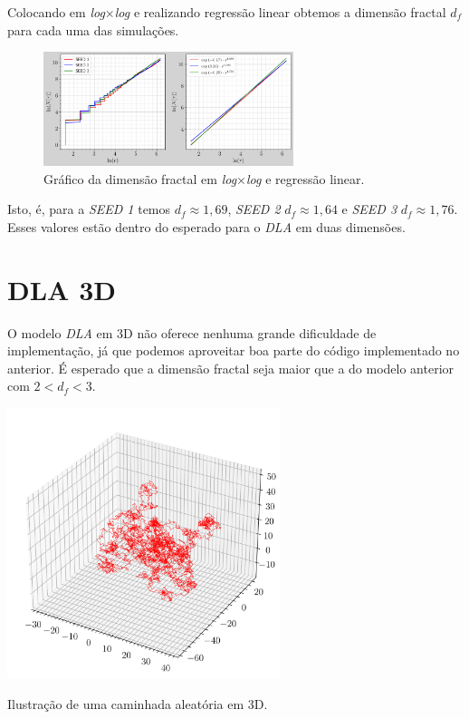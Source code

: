 \documentclass[a4paper, 11pt]{tufte-handout}
\begin{document}
Colocando em \emph{log}$\times$\emph{log} e realizando regressão linear obtemos a dimensão fractal
\( d_f \) para cada uma das simulações.

\begin{figure}
  \centering
  \includegraphics[width=0.65\textwidth]{tarefa-2/tarefa2-graf-regressao-linear-dimensao-fractal.png}
  \caption{Gráfico da dimensão fractal em \emph{log}$\times$\emph{log} e regressão linear.}
  \label{fig:dim_fractal}
\end{figure}

Isto, é, para a \emph{SEED 1} temos \( d_f \approx 1,69 \), \emph{SEED 2} \( d_f \approx 1,64 \)  e
\emph{SEED 3} \( d_f \approx 1,76  \). Esses valores estão dentro do esperado para o \emph{DLA} em duas
dimensões. 


\clearpage
\section{DLA 3D}


O modelo \emph{DLA} em 3D não oferece nenhuma grande dificuldade de implementação, já que podemos
aproveitar boa parte do código implementado no anterior. É esperado que  a dimensão fractal seja
maior que a do modelo anterior com  \( 2 < d_f < 3\).

\begin{marginfigure}
  \includegraphics[width=0.6\textwidth]{tarefa-3/exemplo-random-walk-3D.png}
  \caption{Ilustração de uma caminhada aleatória em 3D.}
\end{marginfigure}
\end{document}

